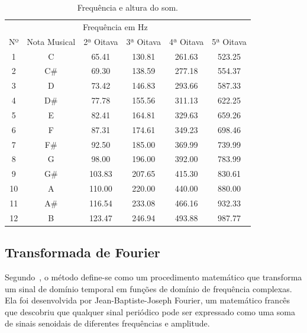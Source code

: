\documentclass{sbrt}
\begin{document}
\begin{table}[ht]
  \centering
  \caption{\label{tab:freq} Frequência e altura do som.}
  \vspace{-0.2cm}
  \begin{tabular}{c c c c c c}
       & \multicolumn{4}{c}{Frequência em Hz}                                                 \\
    Nº & Nota Musical                         & 2ª Oitava & 3ª Oitava & 4ª Oitava & 5ª Oitava \\
    \hline
    1  & C                                    & 65.41     & 130.81    & 261.63    & 523.25    \\
    2  & C\#                                  & 69.30     & 138.59    & 277.18    & 554.37    \\
    3  & D                                    & 73.42     & 146.83    & 293.66    & 587.33    \\
    4  & D\#                                  & 77.78     & 155.56    & 311.13    & 622.25    \\
    5  & E                                    & 82.41     & 164.81    & 329.63    & 659.26    \\
    6  & F                                    & 87.31     & 174.61    & 349.23    & 698.46    \\
    7  & F\#                                  & 92.50     & 185.00    & 369.99    & 739.99    \\
    8  & G                                    & 98.00     & 196.00    & 392.00    & 783.99    \\
    9  & G\#                                  & 103.83    & 207.65    & 415.30    & 830.61    \\
    10 & A                                    & 110.00    & 220.00    & 440.00    & 880.00    \\
    11 & A\#                                  & 116.54    & 233.08    & 466.16    & 932.33    \\
    12 & B                                    & 123.47    & 246.94    & 493.88    & 987.77    \\
  \end{tabular}
\end{table}

\subsection{Transformada de Fourier}

Segundo~\cite{richardson1978fundamentals}, o método define-se como um procedimento matemático que transforma um sinal de
domínio temporal em funções de domínio de frequência complexas. Ela foi desenvolvida por Jean-Baptiste-Joseph Fourier,
um matemático francês que descobriu que qualquer sinal periódico pode ser expressado como uma soma de sinais senoidais
de diferentes frequências e amplitude.
\end{document}

